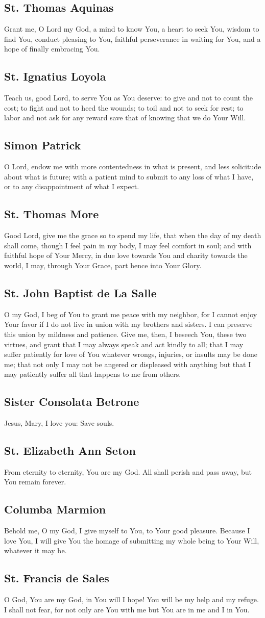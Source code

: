\documentclass[12pt]{article}
\newcommand{\prayertitle}[1]{\subsection{#1}}
\begin{document}
\prayertitle{St. Thomas Aquinas}
Grant me, O Lord my God,
a mind to know You,
a heart to seek You,
wisdom to find You,
conduct pleasing to You,
faithful perseverance in waiting for You,
and a hope of finally embracing You.

\prayertitle{St. Ignatius Loyola}
Teach us, good Lord, to serve You as You deserve:
to give and not to count the cost;
to fight and not to heed the wounds;
to toil and not to seek for rest;
to labor and not ask for any reward save that of knowing that we do Your Will.

\prayertitle{Simon Patrick}
O Lord, endow me with more contentedness in what is present, and less solicitude about what is future;
with a patient mind to submit to any loss of what I have, or to  any disappointment of what I expect.

\prayertitle{St. Thomas More}
Good Lord, give me the grace so to spend my life, that when the day of my death shall come, though I feel pain in my body, I may feel comfort in soul;
and with faithful hope of Your Mercy, in due love towards You and charity towards the world, I may, through Your Grace, part hence into Your Glory.

\prayertitle{St. John Baptist de La Salle}
O my God, I beg of You to grant me peace with my neighbor, for I cannot enjoy Your favor if I do not live in union with my brothers and sisters.
I can preserve this union by mildness and patience.
Give me, then, I beseech You, these two virtues, and grant that I may always speak and act kindly to all;
that I may suffer patiently for love of You whatever wrongs, injuries, or insults may be done me;
that not only I may not be angered or displeased with anything but that I may patiently suffer all that happens to me from others.

\prayertitle{Sister Consolata Betrone}
Jesus, Mary, I love you: Save souls.

\prayertitle{St. Elizabeth Ann Seton}
From eternity to eternity, You are my God.
All shall perish and pass away, but You remain forever.

\prayertitle{Columba Marmion}
Behold me, O my God, I give myself to You, to Your good pleasure.
Because I love You, I will give You the homage of submitting my whole being to Your Will, whatever it may be.

\prayertitle{St. Francis de Sales}
O God, You are my God, in You will I hope!
You will be my help and my refuge.
I shall not fear, for not only are You with me but You are in me and I in You.
\end{document}
